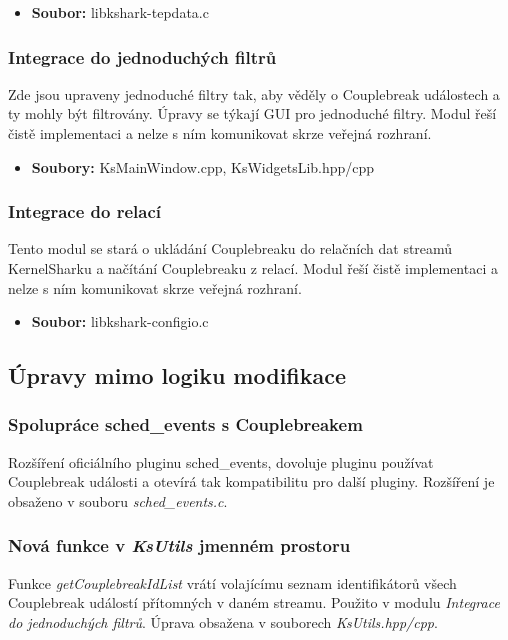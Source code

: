 \begin{itemize}
    \item \textbf{Soubor:} libkshark-tepdata.c
\end{itemize}

\subsubsection*{Integrace do jednoduchých filtrů}
Zde jsou upraveny jednoduché filtry tak, aby věděly o Couplebreak událostech a ty mohly být filtrovány. Úpravy se týkají GUI pro jednoduché filtry. Modul řeší čistě implementaci a nelze s ním komunikovat skrze veřejná rozhraní.

\begin{itemize}
    \item \textbf{Soubory:} KsMainWindow.cpp, KsWidgetsLib.hpp/cpp
\end{itemize}

\subsubsection*{Integrace do relací}
Tento modul se stará o ukládání Couplebreaku do relačních dat streamů KernelSharku a načítání Couplebreaku z relací. Modul řeší čistě implementaci a nelze s ním komunikovat skrze veřejná rozhraní.

\begin{itemize}
    \item \textbf{Soubor:} libkshark-configio.c
\end{itemize}

\subsection{Úpravy mimo logiku modifikace}

\subsubsection*{Spolupráce sched\_events s Couplebreakem}
Rozšíření oficiálního pluginu sched\_events, dovoluje pluginu používat Couplebreak události a otevírá tak kompatibilitu pro další pluginy. Rozšíření je obsaženo v souboru \emph{sched\_events.c}.

\subsubsection*{Nová funkce v \emph{KsUtils} jmenném prostoru}
Funkce \emph{getCouplebreakIdList} vrátí volajícímu seznam identifikátorů všech Couplebreak událostí přítomných v daném streamu. Použito v modulu \emph{Integrace do jednoduchých filtrů}. Úprava obsažena v souborech \emph{KsUtils.hpp/cpp}.

